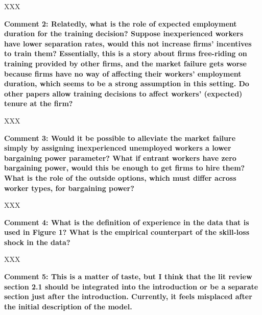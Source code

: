 \documentclass[12pt]{article}
\begin{document}
\begin{onehalfspacing}
\medskip
\noindent
XXX

\bigskip
\bigskip

\textbf{Comment 2: Relatedly, what is the role of expected employment duration for the training decision? Suppose inexperienced workers have lower separation rates, would this not increase firms' incentives to train them? Essentially, this is a story about firms free-riding on training provided by other firms, and the market failure gets worse because firms have no way of affecting their workers' employment duration, which seems to be a strong assumption in this setting. Do other papers allow training decisions to affect workers' (expected) tenure at the firm?}

\medskip
\noindent
XXX

\bigskip
\bigskip

\textbf{Comment 3: Would it be possible to alleviate the market failure simply by assigning inexperienced unemployed workers a lower bargaining power parameter? What if entrant workers have zero bargaining power, would this be enough to get firms to hire them? What is the role of the outside options, which must differ across worker types, for bargaining power?}

\medskip
\noindent
XXX

\bigskip
\bigskip

\textbf{Comment 4: What is the definition of experience in the data that is used in Figure 1? What is the empirical counterpart of the skill-loss shock in the data?}

\medskip
\noindent
XXX

\bigskip
\bigskip

\textbf{Comment 5: This is a matter of taste, but I think that the lit review section 2.1 should be integrated into the introduction or be a separate section just after the introduction. Currently, it feels misplaced after the initial description of the model.}


\end{onehalfspacing}
\end{document}
